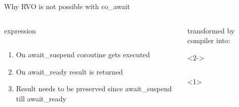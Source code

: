 \documentclass[10pt]{beamer}
\begin{document}
\begin{frame}{Why RVO is not possible with co\_await}
\begin{columns}[T]
\begin{column}{0.3\linewidth}
\centerline{expression}
\vfill
\inputminted{c++}{code-examples/RVO_examples/co_await.cpp}
\vfill

\begin{enumerate}
	\item<2-> On \alert{await\_suspend} coroutine gets executed
	\item<3-> On \alert{await\_ready} result is returned
	\item<4-> Result needs to be preserved since \alert{await\_suspend} till \alert{await\_ready}
\end{enumerate}

\end{column}
\begin{column}{0.55\linewidth}
\centerline{transformed by compiler into:}
\vfill
\begin{onlyenv}<2->
\inputminted[highlightlines={5,8}]{c++}{code-examples/RVO_examples/transformed_co_await.cpp}
\end{onlyenv}
<1>
\vfill
\end{column}
\end{columns}
\end{frame}
\end{document}
